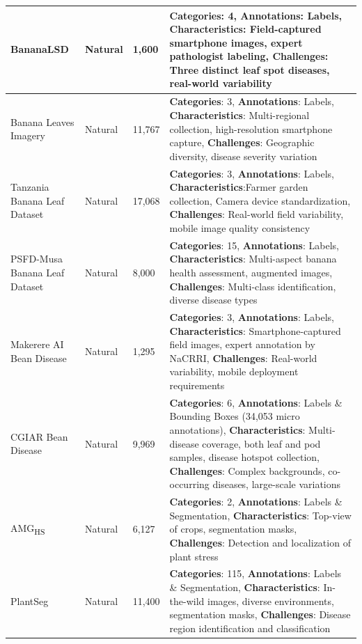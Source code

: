 \documentclass[sn-mathphys]{sn-jnl}
\theoremstyle{thmstyleone}%
\theoremstyle{thmstyletwo}%
\theoremstyle{thmstylethree}%
\begin{document}
\begin{footnotesize}
\begin{longtable}{@{}p{3cm}p{2cm}p{2cm}p{5cm}@{}}
  \midrule
  BananaLSD \citep{bhuiyan2023bananasqueezenet,arman2023bananalsd} & Natural & 1,600 & \textbf{Categories}: 4, \textbf{Annotations}: Labels, \textbf{Characteristics}: Field-captured smartphone images, expert pathologist labeling, \textbf{Challenges}: Three distinct leaf spot diseases, real-world variability \\
  \midrule
  Banana Leaves Imagery \citep{mduma2025banana} & Natural & 11,767 & \textbf{Categories}: 3, \textbf{Annotations}: Labels, \textbf{Characteristics}: Multi-regional collection, high-resolution smartphone capture, \textbf{Challenges}: Geographic diversity, disease severity variation \\
  \midrule
    Tanzania Banana Leaf Dataset \citep{mduma2022nelson} & Natural & 17,068 & \textbf{Categories}: 3, \textbf{Annotations}: Labels, \textbf{Characteristics}:Farmer garden collection, Camera device standardization, \textbf{Challenges}: Real-world field variability, mobile image quality consistency \\
   \midrule
  PSFD-Musa Banana Leaf Dataset\citep{medhi2022psfd} & Natural & 8,000 & \textbf{Categories}: 15, \textbf{Annotations}: Labels, \textbf{Characteristics}: Multi-aspect banana health assessment, augmented images, \textbf{Challenges}: Multi-class identification, diverse disease types \\
  \midrule
  Makerere AI Bean Disease \citep{makerere2020bean} & Natural & 1,295 & \textbf{Categories}: 3, \textbf{Annotations}: Labels, \textbf{Characteristics}: Smartphone-captured field images, expert annotation by NaCRRI, \textbf{Challenges}: Real-world variability, mobile deployment requirements \\
  \midrule
  CGIAR Bean Disease \citep{gomez2024advancing} & Natural & 9,969 & \textbf{Categories}: 6, \textbf{Annotations}: Labels \& Bounding Boxes (34,053 micro annotations), \textbf{Characteristics}: Multi-disease coverage, both leaf and pod samples, disease hotspot collection, \textbf{Challenges}: Complex backgrounds, co-occurring diseases, large-scale variations \\
  \midrule
  AMG\textsubscript{HS} \citep{Sama_2023_ICCV} & Natural & 6,127 & \textbf{Categories}: 2, \textbf{Annotations}: Labels \& Segmentation, \textbf{Characteristics}: Top-view of crops, segmentation masks, \textbf{Challenges}: Detection and localization of plant stress \\
  \midrule 
  PlantSeg \citep{wei2024plantseg} & Natural & 11,400 & \textbf{Categories}: 115, \textbf{Annotations}: Labels \& Segmentation, \textbf{Characteristics}: In-the-wild images, diverse environments, segmentation masks, \textbf{Challenges}: Disease region identification and classification \\

\end{longtable}
\end{footnotesize}
\end{document}
